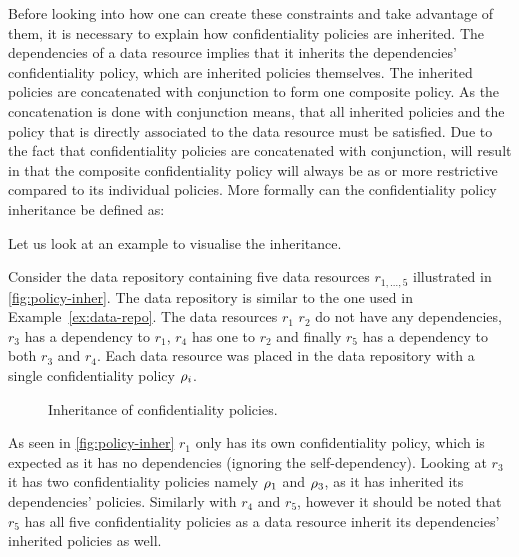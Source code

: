 \begin{definition}\label{def:scp}
\end{definition}

Before looking into how one can create these constraints and take advantage of them, it is necessary to explain how confidentiality policies are inherited. The dependencies of a data resource implies that it inherits the dependencies' confidentiality policy, which are inherited policies themselves. The inherited policies are concatenated with conjunction to form one composite policy. As the concatenation is done with conjunction means, that all inherited policies and the policy that is directly associated to the data resource must be satisfied. Due to the fact that confidentiality policies are concatenated with conjunction, will result in that the composite confidentiality policy will always be as or more restrictive compared to its individual policies. More formally can the confidentiality policy inheritance be defined as:
\begin{definition}\label{def:cpi}
\end{definition}

Let us look at an example to visualise the inheritance.
\begin{example}
Consider the data repository containing five data resources $r_{1,\ldots,5}$ illustrated in \autoref{fig:policy-inher}. The data repository is similar to the one used in Example~\ref{ex:data-repo}. The data resources $r_1$ $r_2$ do not have any dependencies, $r_3$ has a dependency to $r_1$, $r_4$ has one to $r_2$ and finally $r_5$ has a dependency to both $r_3$ and $r_4$. Each data resource was placed in the data repository with a single confidentiality policy $\rho_i$.
\begin{figure}[!ht]
    \begin{center}
        
        \caption{Inheritance of confidentiality policies.}
        \label{fig:policy-inher}
    \end{center}
\end{figure}
As seen in \autoref{fig:policy-inher} $r_1$ only has its own confidentiality policy, which is expected as it has no dependencies (ignoring the self-dependency). Looking at $r_3$ it has two confidentiality policies namely $\rho_1$ and $\rho_3$, as it has inherited its dependencies' policies. Similarly with $r_4$ and $r_5$, however it should be noted that $r_5$ has all five confidentiality policies as a data resource inherit its dependencies' inherited policies as well.
\end{example}

